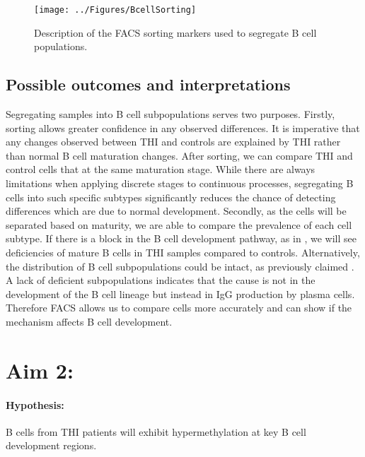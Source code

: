 \documentclass[12pt]{article}
\begin{document}
				\begin{figure}[tb]
					\centering
					\texttt{[image: ../Figures/BcellSorting]}
					\caption{Description of the FACS sorting markers used to segregate B cell populations.}
					\label{fig:BCellSorting} 
				\end{figure}

		
		\subsection{Possible outcomes and interpretations}		
		
		
			Segregating samples into B cell subpopulations serves two purposes. 
			Firstly, sorting allows greater confidence in any observed differences.
			It is imperative that any changes observed between THI and controls are explained by THI rather than normal B cell maturation changes.
			After sorting, we can compare THI and control cells that at the same maturation stage. 
			While there are always limitations when applying discrete stages to continuous processes, segregating B cells into such specific subtypes significantly reduces the chance of detecting differences which are due to normal development. 
			Secondly, as the cells will be separated based on maturity, we are able to compare the prevalence of each cell subtype. 
			If there is a block in the B cell development pathway, as in \citet{Tallmadge15}, we will see deficiencies of mature B cells in THI samples compared to controls.
			Alternatively, the distribution of B cell subpopulations could be intact, as previously claimed \citep{Tiller78,Stiemh80,Siegel81,Buckley83,Fiorilli86,Dressler89}.
			A lack of deficient subpopulations indicates that the cause is not in the development of the B cell lineage but instead in IgG production by plasma cells. 
			Therefore FACS allows us to compare cells more accurately and can show if the mechanism affects B cell development.
			
	
	\section{Aim 2:}
	
		\paragraph{Hypothesis:} B cells from THI patients will exhibit hypermethylation at key B cell development regions.
		
\end{document}
